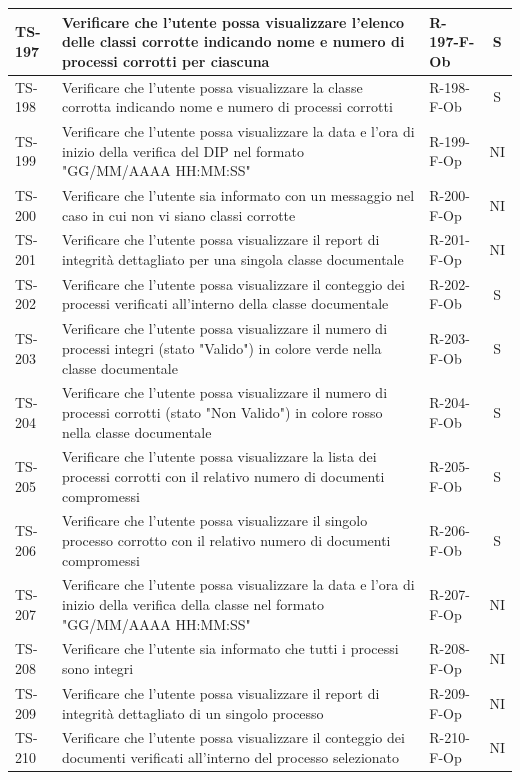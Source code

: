 \documentclass[a4paper,12pt]{article}
\begin{document}
\begin{longtable}{|p{1.5cm}|p{8.3cm}|p{2.4cm}|c|}
\hline
TS-197 & Verificare che l'utente possa visualizzare l'elenco delle classi corrotte indicando nome e numero di processi corrotti per ciascuna & R-197-F-Ob & S \\
\hline
TS-198 & Verificare che l'utente possa visualizzare la classe corrotta indicando nome e numero di processi corrotti & R-198-F-Ob & S \\
\hline
TS-199 & Verificare che l'utente possa visualizzare la data e l'ora di inizio della verifica del DIP nel formato "GG/MM/AAAA HH:MM:SS" & R-199-F-Op & NI \\
\hline
TS-200 & Verificare che l'utente sia informato con un messaggio nel caso in cui non vi siano classi corrotte & R-200-F-Op & NI \\
\hline
TS-201 & Verificare che l'utente possa visualizzare il report di integrità dettagliato per una singola classe documentale & R-201-F-Op & NI \\
\hline
TS-202 & Verificare che l'utente possa visualizzare il conteggio dei processi verificati all'interno della classe documentale & R-202-F-Ob & S \\
\hline
TS-203 & Verificare che l'utente possa visualizzare il numero di processi integri (stato "Valido") in colore verde nella classe documentale & R-203-F-Ob & S \\
\hline
TS-204 & Verificare che l'utente possa visualizzare il numero di processi corrotti (stato "Non Valido") in colore rosso nella classe documentale & R-204-F-Ob & S \\
\hline
TS-205 & Verificare che l'utente possa visualizzare la lista dei processi corrotti con il relativo numero di documenti compromessi & R-205-F-Ob & S \\
\hline
TS-206 & Verificare che l'utente possa visualizzare il singolo processo corrotto con il relativo numero di documenti compromessi & R-206-F-Ob & S \\
\hline
TS-207 & Verificare che l'utente possa visualizzare la data e l'ora di inizio della verifica della classe nel formato "GG/MM/AAAA HH:MM:SS" & R-207-F-Op & NI \\
\hline
TS-208 & Verificare che l'utente sia informato che tutti i processi sono integri & R-208-F-Op & NI \\
\hline
TS-209 & Verificare che l'utente possa visualizzare il report di integrità dettagliato di un singolo processo & R-209-F-Op & NI \\
\hline
TS-210 & Verificare che l'utente possa visualizzare il conteggio dei documenti verificati all'interno del processo selezionato & R-210-F-Op & NI \\

\end{longtable}
\end{document}
